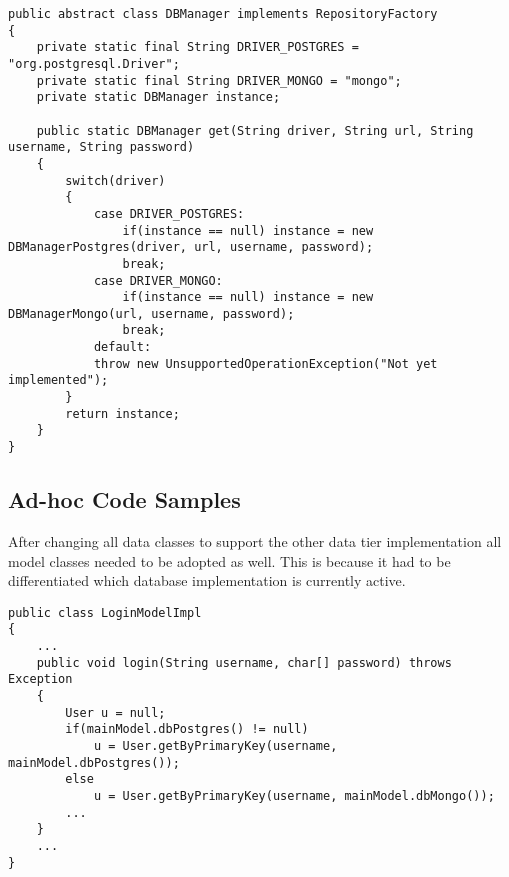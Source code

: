 \begin{lstlisting}
public abstract class DBManager implements RepositoryFactory
{
	private static final String DRIVER_POSTGRES = "org.postgresql.Driver";
	private static final String DRIVER_MONGO = "mongo";
	private static DBManager instance;
	
	public static DBManager get(String driver, String url, String username, String password)
	{
		switch(driver)
		{
			case DRIVER_POSTGRES:
				if(instance == null) instance = new DBManagerPostgres(driver, url, username, password);
				break;
			case DRIVER_MONGO:
				if(instance == null) instance = new DBManagerMongo(url, username, password);
				break;
			default:
			throw new UnsupportedOperationException("Not yet implemented");
		}
		return instance;
	}
}
\end{lstlisting}

\subsection{Ad-hoc Code Samples}
After changing all data classes to support the other data tier implementation all model classes needed to be adopted as well. This is because it had to be differentiated which database implementation is currently active. 

\begin{lstlisting}
public class LoginModelImpl
{
	...
	public void login(String username, char[] password) throws Exception
	{
		User u = null;
		if(mainModel.dbPostgres() != null)
			u = User.getByPrimaryKey(username, mainModel.dbPostgres());
		else
			u = User.getByPrimaryKey(username, mainModel.dbMongo());
		...
	}
	...
}
\end{lstlisting}